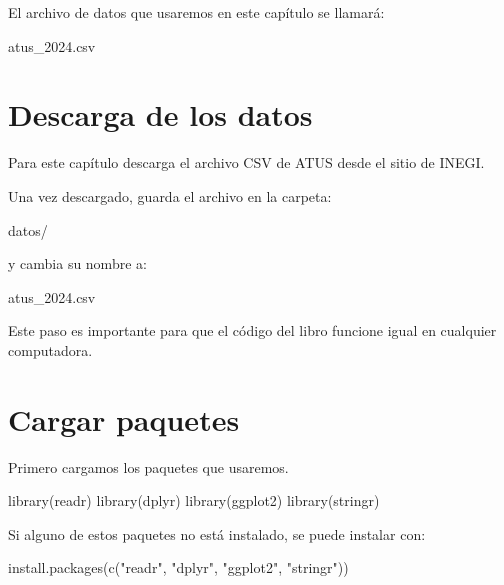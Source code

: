 \documentclass[
  11pt,
  letterpaper,
]{book}
\newenvironment{Shaded}{\begin{snugshade}}{\end{snugshade}}
\newcommand{\FunctionTok}[1]{\textcolor[rgb]{0.28,0.35,0.67}{#1}}
\newcommand{\NormalTok}[1]{\textcolor[rgb]{0.00,0.23,0.31}{#1}}
\newcommand{\StringTok}[1]{\textcolor[rgb]{0.13,0.47,0.30}{#1}}
\begin{document}
El archivo de datos que usaremos en este capítulo se llamará:

\begin{Shaded}
\begin{Highlighting}[]
\NormalTok{atus\_2024.csv}
\end{Highlighting}
\end{Shaded}

\section{Descarga de los datos}\label{descarga-de-los-datos}

Para este capítulo descarga el archivo CSV de ATUS desde el sitio de
INEGI.

Una vez descargado, guarda el archivo en la carpeta:

\begin{Shaded}
\begin{Highlighting}[]
\NormalTok{datos/}
\end{Highlighting}
\end{Shaded}

y cambia su nombre a:

\begin{Shaded}
\begin{Highlighting}[]
\NormalTok{atus\_2024.csv}
\end{Highlighting}
\end{Shaded}

Este paso es importante para que el código del libro funcione igual en
cualquier computadora.

\section{Cargar paquetes}\label{cargar-paquetes}

Primero cargamos los paquetes que usaremos.

\begin{Shaded}
\begin{Highlighting}[]
\FunctionTok{library}\NormalTok{(readr)}
\FunctionTok{library}\NormalTok{(dplyr)}
\FunctionTok{library}\NormalTok{(ggplot2)}
\FunctionTok{library}\NormalTok{(stringr)}
\end{Highlighting}
\end{Shaded}

Si alguno de estos paquetes no está instalado, se puede instalar con:

\begin{Shaded}
\begin{Highlighting}[]
\FunctionTok{install.packages}\NormalTok{(}\FunctionTok{c}\NormalTok{(}\StringTok{"readr"}\NormalTok{, }\StringTok{"dplyr"}\NormalTok{, }\StringTok{"ggplot2"}\NormalTok{, }\StringTok{"stringr"}\NormalTok{))}
\end{Highlighting}
\end{Shaded}
\end{document}
